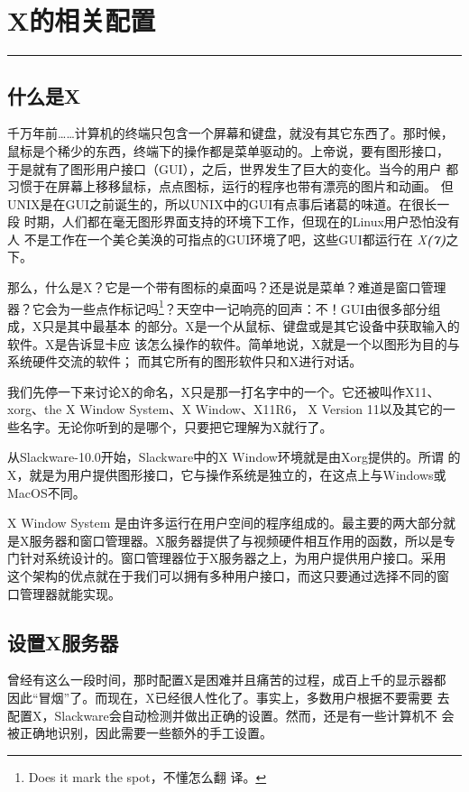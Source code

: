 
\chapter{X的相关配置}
\label{chap:xconfiguration}

\begin{flushleft}
\rule[0mm]{\textwidth}{.1pt}
\end{flushleft}

\section{什么是X}
\label{chap:xconfiguration:whatis}
千万年前……计算机的终端只包含一个屏幕和键盘，就没有其它东西了。那时候，
鼠标是个稀少的东西，终端下的操作都是菜单驱动的。上帝说，要有图形接口，
于是就有了图形用户接口（GUI），之后，世界发生了巨大的变化。当今的用户
都习惯于在屏幕上移移鼠标，点点图标，运行的程序也带有漂亮的图片和动画。
但UNIX是在GUI之前诞生的，所以UNIX中的GUI有点事后诸葛的味道。在很长一段
时期，人们都在毫无图形界面支持的环境下工作，但现在的Linux用户恐怕没有人
不是工作在一个美仑美涣的可指点的GUI环境了吧，这些GUI都运行在
\textit{X\textbf{(7)}}之下。

那么，什么是X？它是一个带有图标的桌面吗？还是说是菜单？难道是窗口管理
器？它会为一些点作标记吗\footnote{Does it mark the spot，不懂怎么翻
  译。}？天空中一记响亮的回声：不！GUI由很多部分组成，X只是其中最基本
的部分。X是一个从鼠标、键盘或是其它设备中获取输入的软件。X是告诉显卡应
该怎么操作的软件。简单地说，X就是一个以图形为目的与系统硬件交流的软件；
而其它所有的图形软件只和X进行对话。

我们先停一下来讨论X的命名，X只是那一打名字中的一个。它还被叫作X11、
xorg、the X Window System、X Window、X11R6， X Version 11以及其它的一
些名字。无论你听到的是哪个，只要把它理解为X就行了。

从Slackware-10.0开始，Slackware中的X Window环境就是由Xorg提供的。所谓
的X，就是为用户提供图形接口，它与操作系统是独立的，在这点上与Windows或
MacOS不同。

X Window System 是由许多运行在用户空间的程序组成的。最主要的两大部分就
是X服务器和窗口管理器。X服务器提供了与视频硬件相互作用的函数，所以是专
门针对系统设计的。窗口管理器位于X服务器之上，为用户提供用户接口。采用
这个架构的优点就在于我们可以拥有多种用户接口，而这只要通过选择不同的窗
口管理器就能实现。

\section{设置X服务器}
\label{chap:xconfiguration:configuration}
曾经有这么一段时间，那时配置X是困难并且痛苦的过程，成百上千的显示器都
因此``冒烟''了。而现在，X已经很人性化了。事实上，多数用户根据不要需要
去配置X，Slackware会自动检测并做出正确的设置。然而，还是有一些计算机不
会被正确地识别，因此需要一些额外的手工设置。

